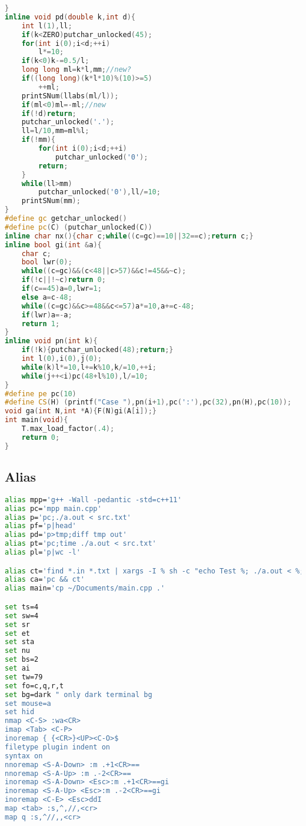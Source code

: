 \documentclass[11pt]{article}
\begin{document}
\begin{lstlisting}[language=C++]
}
inline void pd(double k,int d){
    int l(1),ll;
    if(k<ZERO)putchar_unlocked(45);
    for(int i(0);i<d;++i)
        l*=10;
    if(k<0)k-=0.5/l;
    long long ml=k*l,mm;//new?
    if((long long)(k*l*10)%(10)>=5)
        ++ml;
    printSNum(llabs(ml/l));
    if(ml<0)ml=-ml;//new
    if(!d)return;
    putchar_unlocked('.');
    ll=l/10,mm=ml%l;
    if(!mm){
        for(int i(0);i<d;++i)
            putchar_unlocked('0');
        return;
    }
    while(ll>mm)
        putchar_unlocked('0'),ll/=10;
    printSNum(mm);
}
#define gc getchar_unlocked()
#define pc(C) (putchar_unlocked(C))
inline char nx(){char c;while((c=gc)==10||32==c);return c;}
inline bool gi(int &a){
    char c;
    bool lwr(0);
    while((c=gc)&&(c<48||c>57)&&c!=45&&~c);
    if(!c||!~c)return 0;
    if(c==45)a=0,lwr=1;
    else a=c-48;
    while((c=gc)&&c>=48&&c<=57)a*=10,a+=c-48;
    if(lwr)a=-a;
    return 1;
}
inline void pn(int k){
    if(!k){putchar_unlocked(48);return;}
    int l(0),i(0),j(0);
    while(k)l*=10,l+=k%10,k/=10,++i;
    while(j++<i)pc(48+l%10),l/=10;
}
#define pe pc(10)
#define CS(H) (printf("Case "),pn(i+1),pc(':'),pc(32),pn(H),pc(10));
void ga(int N,int *A){F(N)gi(A[i]);}
int main(void){
    T.max_load_factor(.4);
    return 0;
}
\end{lstlisting}
\subsection{Alias}
\begin{lstlisting}[language=bash]
alias mpp='g++ -Wall -pedantic -std=c++11'
alias pc='mpp main.cpp'
alias p='pc;./a.out < src.txt'
alias pf='p|head'
alias pd='p>tmp;diff tmp out'
alias pt='pc;time ./a.out < src.txt'
alias pl='p|wc -l'

alias ct='find *.in *.txt | xargs -I % sh -c "echo Test %; ./a.out < %;"'
alias ca='pc && ct'
alias main='cp ~/Documents/main.cpp .'

set ts=4
set sw=4
set sr
set et
set sta
set nu
set bs=2
set ai
set tw=79
set fo=c,q,r,t
set bg=dark " only dark terminal bg
set mouse=a
set hid
nmap <C-S> :wa<CR>
imap <Tab> <C-P>
inoremap { {<CR>}<UP><C-O>$
filetype plugin indent on
syntax on
nnoremap <S-A-Down> :m .+1<CR>==
nnoremap <S-A-Up> :m .-2<CR>==
inoremap <S-A-Down> <Esc>:m .+1<CR>==gi
inoremap <S-A-Up> <Esc>:m .-2<CR>==gi
inoremap <C-E> <Esc>ddI
map <tab> :s,^,//,<cr>
map q :s,^//,,<cr>
\end{lstlisting}
\end{document}
